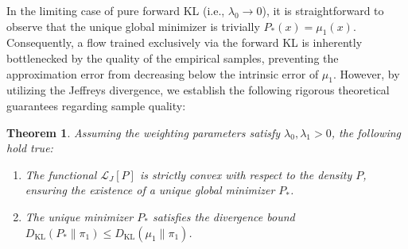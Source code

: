 \documentclass[%
 reprint,
 amsmath,amssymb,
 aps,
 pre,
]{revtex4-2}
\newtheorem{theorem}{Theorem}
\DeclareMathOperator{\KL}{KL}
\newcommand{\Le}{\leqslant}
\begin{document}
In the limiting case of pure forward KL (i.e., $\lambda_0 \to 0$), it is straightforward to observe that the unique global minimizer is trivially $P_*(x) = \mu_1(x)$. Consequently, a flow trained exclusively via the forward KL is inherently bottlenecked by the quality of the empirical samples, preventing the approximation error from decreasing below the intrinsic error of $\mu_1$. However, by utilizing the Jeffreys divergence, we establish the following rigorous theoretical guarantees regarding sample quality:
\begin{theorem}
\label{theorem: correct}
Assuming the weighting parameters satisfy $\lambda_0, \lambda_1 > 0$, the following hold true:
\begin{enumerate}
	\setlength{\itemsep}{4pt}
	\item The functional $\mathcal L_J[P]$ is strictly convex with respect to the density $P$, ensuring the existence of a unique global minimizer $P_*$.
	\item The unique minimizer $P_*$ satisfies the divergence bound $D_{\KL}(P_*\|\pi_1 ) \Le D_{\KL}(\mu_1\|\pi_1)$.
\end{enumerate}
\end{theorem}
\mbox{}
\end{document}
